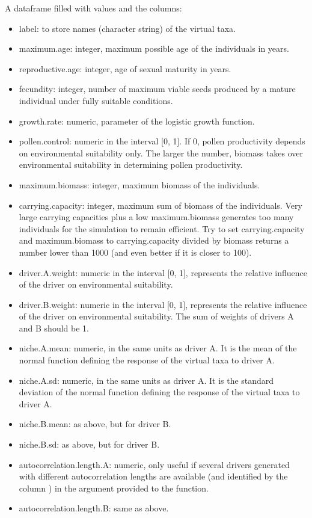 \documentclass[letterpaper]{book}
\begin{document}
%
\begin{Value}
A dataframe filled with  values and the columns:
\begin{itemize}

\item label: to store names (character string) of the virtual taxa.
\item maximum.age: integer, maximum possible age of the individuals in years.
\item reproductive.age: integer, age of sexual maturity in years.
\item fecundity: integer, number of maximum viable seeds produced by a mature individual under fully suitable conditions.
\item growth.rate: numeric, parameter of the logistic growth function.
\item pollen.control: numeric in the interval [0, 1]. If 0, pollen productivity depends on environmental suitability only. The larger the number, biomass takes over environmental suitability in determining pollen productivity.
\item maximum.biomass: integer, maximum biomass of the individuals.
\item carrying.capacity: integer, maximum sum of biomass of the individuals. Very large carrying capacities plus a low maximum.biomass generates too many individuals for the simulation to remain efficient. Try to set carrying.capacity and maximum.biomass to carrying.capacity divided by biomass returns a number lower than 1000 (and even better if it is closer to 100).
\item driver.A.weight: numeric in the interval [0, 1], represents the relative influence of the driver on environmental suitability.
\item driver.B.weight: numeric in the interval [0, 1], represents the relative influence of the driver on environmental suitability. The sum of weights of drivers A and B should be 1.
\item niche.A.mean: numeric, in the same units as driver A. It is the mean of the normal function defining the response of the virtual taxa to driver A.
\item niche.A.sd: numeric, in the same units as driver A. It is the standard deviation of the normal function defining the response of the virtual taxa to driver A.
\item niche.B.mean: as above, but for driver B.
\item niche.B.sd: as above, but for driver B.
\item autocorrelation.length.A: numeric, only useful if several drivers generated with different autocorrelation lengths are available (and identified by the column ) in the  argument provided to the  function.
\item autocorrelation.length.B: same as above.

\end{itemize}

\end{Value}
\end{document}
